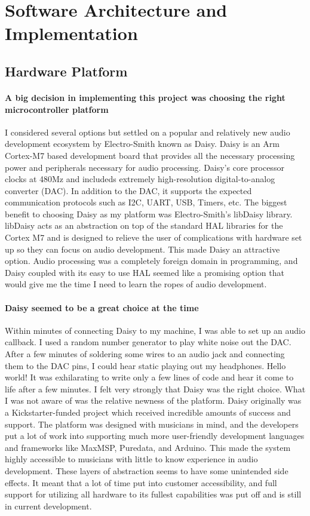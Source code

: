 \documentclass[acmlarge,screen]{acmart}
\begin{document}
\section{Software Architecture and Implementation}

\subsection{Hardware Platform}
	\paragraph{A big decision in implementing this project was choosing the right microcontroller platform} I considered several options but settled on a popular and relatively new audio development ecosystem by Electro-Smith known as Daisy. Daisy is an Arm Cortex-M7 based development board that provides all the necessary processing power and peripherals necessary for audio processing. Daisy's core processor clocks at 480Mz and includeds extremely high-resolution digital-to-analog converter (DAC). In addition to the DAC, it supports the expected communication protocols such as I2C, UART, USB, Timers, etc. The biggest benefit to choosing Daisy as my platform was Electro-Smith's libDaisy library. libDaisy acts as an abstraction on top of the standard HAL libraries for the Cortex M7 and is designed to relieve the user of complications with hardware set up so they can focus on audio development. This made Daisy an attractive option. Audio processing was a completely foreign domain in programming, and Daisy coupled with its easy to use HAL seemed like a promising option that would give me the time I need to learn the ropes of audio development.

	\paragraph{Daisy seemed to be a great choice at the time} Within minutes of connecting Daisy to my machine, I was able to set up an audio callback. I used a random number generator to play white noise out the DAC. After a few minutes of soldering some wires to an audio jack and connecting them to the DAC pins, I could hear static playing out my headphones. Hello world! It was exhilarating to write only a few lines of code and hear it come to life after a few minutes. I felt very strongly that Daisy was the right choice. What I was not aware of was the relative newness of the platform. Daisy originally was a Kickstarter-funded project which received incredible amounts of success and support. The platform was designed with musicians in mind, and the developers put a lot of work into supporting much more user-friendly development languages and frameworks like MaxMSP, Puredata, and Arduino. This made the system highly accessible to musicians with little to know experience in audio development. These layers of abstraction seems to have some unintended side effects. It meant that a lot of time put into customer accessibility, and full support for utilizing all hardware to its fullest capabilities was put off and is still in current development.
\end{document}
